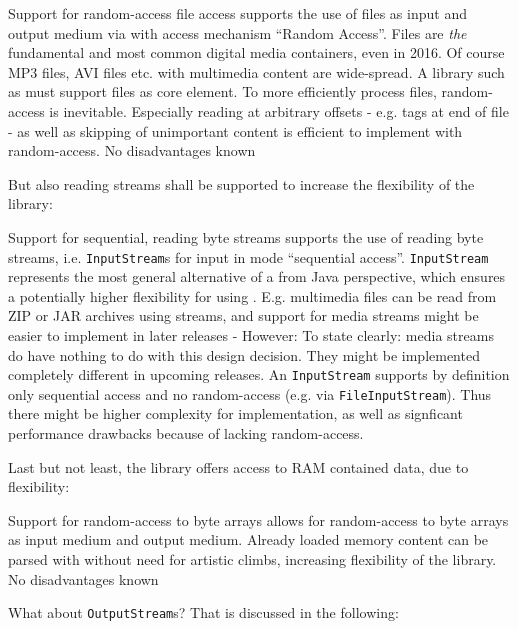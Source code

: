 {%
Support for random-access file access
}
{%
\LibName{} supports the use of files as input and output medium via \COMPmedia{} with access mechanism ``Random Access''.
}
{%
Files are \emph{the} fundamental and most common digital media containers, even in 2016. Of course MP3 files, AVI files etc. with multimedia content are wide-spread. A library such as \LibName{} must support files as core element. To more efficiently process files, random-access is inevitable. Especially reading at arbitrary offsets \-- e.g. tags at end of file \-- as well as skipping of unimportant content is efficient to implement with random-access.
}
{%
No disadvantages known
}

But also reading streams shall be supported to increase the flexibility of the library:

{%
Support for sequential, reading byte streams
}
{%
\LibName{} supports the use of reading byte streams, i.e. \texttt{InputStream}s for input in mode ``sequential access''.
}
{%
\texttt{InputStream} represents the most general alternative of a \TERMmedium{} from Java perspective, which ensures a potentially higher flexibility for using \LibName{}. E.g. multimedia files can be read from ZIP or JAR archives using streams, and support for media streams might be easier to implement in later releases \-- However: To state clearly: media streams do have nothing to do with this design decision. They might be implemented completely different in upcoming releases.
}
{%
An \texttt{InputStream} supports by definition only sequential access and no random-access (e.g. via \texttt{FileInputStream}). Thus there might be higher complexity for implementation, as well as signficant performance drawbacks because of lacking random-access.
}

Last but not least, the library offers access to RAM contained data, due to flexibility:

{%
Support for random-access to byte arrays
}
{%
\LibName{} allows for random-access to byte arrays as input medium and output medium.
}
{%
Already loaded memory content can be parsed with \LibName{} without need for artistic climbs, increasing flexibility of the library.
}
{%
No disadvantages known
}

What about \texttt{OutputStream}s? That is discussed in the following:

